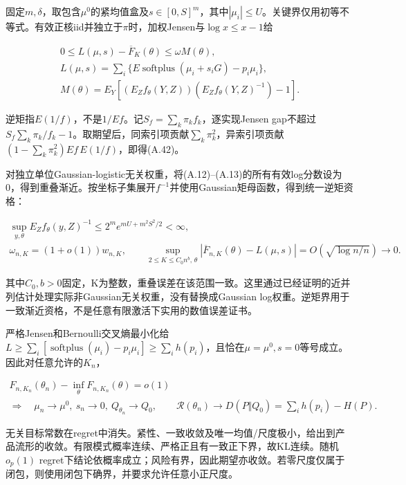 \documentclass[11pt,a4paper]{article}
\begin{document}
固定\(m,\delta\)，取包含\(\mu^0\)的紧均值盒及\(s\in[0,S]^m\)，其中\(|\mu_i|\le U\)。关键界仅用初等不等式。有效正核iid并独立于\(\pi\)时，加权Jensen与\(\log x\le x-1\)给

\[
\begin{gathered}
0\le L(\mu,s)-\overline F_K(\theta)\le\omega M(\theta),\\
L(\mu,s)=\sum_i\{E\operatorname{softplus}(\mu_i+s_iG)-p_i\mu_i\},\\
M(\theta)=E_Y[(E_Zf_\theta(Y,Z))(E_Zf_\theta(Y,Z)^{-1})-1].
\end{gathered}
\tag{A.42}
\]

逆矩指\(E(1/f)\)，不是\(1/Ef\)。记\(S_f=\sum_k\pi_kf_k\)，逐实现Jensen
gap不超过\(S_f\sum_k\pi_k/f_k-1\)。取期望后，同索引项贡献\(\sum_k\pi_k^2\)，异索引项贡献\((1-\sum_k\pi_k^2)Ef\,E(1/f)\)，即得(A.42)。

对独立单位Gaussian-logistic无关权重，将(A.12)--(A.13)的所有有效log分数设为0，得到重叠渐近。按坐标子集展开\(f^{-1}\)并使用Gaussian矩母函数，得到统一逆矩资格：

\[
\begin{gathered}
\sup_{y,\theta}E_Zf_\theta(y,Z)^{-1}\le2^m e^{mU+m^2S^2/2}<\infty,\\
\omega_{n,K}=(1+o(1))w_{n,K},\qquad
\sup_{2\le K\le C_0n^b,\,\theta}|\overline F_{n,K}(\theta)-L(\mu,s)|
=O\!\left(\sqrt{\log n/n}\right)\to0 .
\end{gathered}
\tag{A.43}
\]

其中\(C_0,b>0\)固定，K为整数，重叠误差在该范围一致。这里通过已经证明的近并列估计处理实际非Gaussian无关权重，没有替换成Gaussian
log权重。逆矩界用于一致渐近资格，不是任意有限激活下实用的数值误差证书。

严格Jensen和Bernoulli交叉熵最小化给
\(L\ge\sum_i[\operatorname{softplus}(\mu_i)-p_i\mu_i]\ge\sum_i h(p_i)\)，且恰在\(\mu=\mu^0,s=0\)等号成立。因此对任意允许的\(K_n\)，

\[
\begin{gathered}
F_{n,K_n}(\theta_n)-\inf_\theta F_{n,K_n}(\theta)=o(1)\\
\Longrightarrow\quad\mu_n\to\mu^0,\ s_n\to0,\ Q_{\theta_n}\to Q_0,\qquad
\mathcal R(\theta_n)\to D(P\Vert Q_0)=\sum_i h(p_i)-H(P).
\end{gathered}
\tag{A.44}
\]

无关目标常数在regret中消失。紧性、一致收敛及唯一均值/尺度极小，给出到产品流形的收敛。有限模式概率连续、严格正且有一致正下界，故KL连续。随机\(o_p(1)\)
regret下结论依概率成立；风险有界，因此期望亦收敛。若零尺度仅属于闭包，则使用闭包下确界，并要求允许任意小正尺度。
\end{document}
